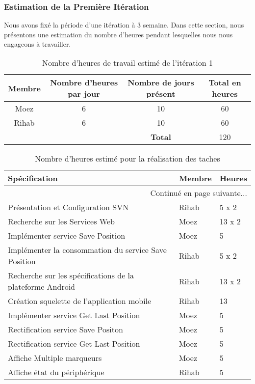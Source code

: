\subsubsection{Estimation de la Première Itération}

Nous avons fixé la période d'une itération à 3 semaine. Dans cette section,
nous présentons une estimation du nombre d'heures pendant lesquelles nous nous
engageons à travailler.

\begin{table}[htbp]
    \centering
    \begin{tabular}{| c | c | c | c |}
\hline
\textbf{Membre} & \textbf{Nombre d'heures par jour} & \textbf{Nombre de jours présent} & \textbf{Total en heures} \\ \hline
\hline

Moez & 6 & 10 & 60\\ \hline
Rihab & 6 & 10 & 60 \\ \hline
\multicolumn{2}{c|}{} & \textbf{Total} & 120 \\ \cline{3-4}
    \end{tabular}
    \caption{Nombre d'heures de travail estimé de l'itération 1}
    \label{tab:sprint1-capacity}
\end{table}

\begin{center}
    \begin{longtable}{| l | l | l |}
        \caption{Nombre d'heures estimé pour la réalisation des taches}
        \label{tab:sprint1-estimation} \\

 \hline
 \textbf{Spécification} & \textbf{Membre} & \textbf{Heures} \\ \hline
 \endhead

 \hline \multicolumn{3}{|r|}{{Continué en page suivante$\dotsc$}} \\ \hline
 \endfoot

 \hline \hline
 \endlastfoot

\hline
Présentation et Configuration SVN & Rihab & 5 x 2 \\ \hline
Recherche sur les Services Web & Moez & 13 x 2 \\ \hline
Implémenter service Save Position & Moez & 5 \\ \hline
Implémenter la consommation du service Save Position & Rihab & 5 x 2 \\ \hline
Recherche sur les spécifications de la plateforme Android & Rihab & 13 x 2 \\ \hline
Création squelette de l'application mobile & Rihab & 13 \\ \hline
Implémenter service Get Last Position & Moez & 5 \\ \hline
Rectification service Save Positon & Moez & 5 \\ \hline
Rectification service Get Last Position & Moez & 5 \\ \hline
Affiche Multiple marqueurs & Moez & 5 \\ \hline
Affiche état du périphérique & Rihab & 5 \\ \hline
\end{longtable}
\end{center}

